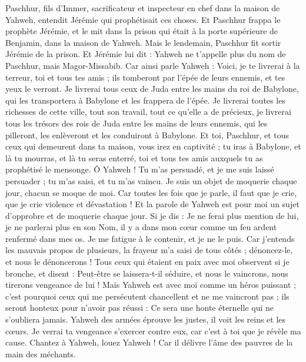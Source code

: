 \begin{multicols}{2}
\VerseOne{}Paschhur, fils d'Immer, sacrificateur et inspecteur en chef dans la maison de Yahweh, entendit Jérémie qui prophétisait ces choses.
Et Paschhur frappa le prophète Jérémie, et le mit dans la prison qui était à la porte supérieure de Benjamin, dans la maison de Yahweh.
Mais le lendemain, Paschhur fit sortir Jérémie de la prison. Et Jérémie lui dit : Yahweh ne t'appelle plus du nom de Paschhur, mais Magor-Missabib.
Car ainsi parle Yahweh : Voici, je te livrerai à la terreur, toi et tous tes amis ; ils tomberont par l'épée de leurs ennemis, et tes yeux le verront. Je livrerai tous ceux de Juda entre les mains du roi de Babylone, qui les transportera à Babylone et les frappera de l'épée.
Je livrerai toutes les richesses de cette ville, tout son travail, tout ce qu'elle a de précieux, je livrerai tous les trésors des rois de Juda entre les mains de leurs ennemis, qui les pilleront, les enlèveront et les conduiront à Babylone.
Et toi, Paschhur, et tous ceux qui demeurent dans ta maison, vous irez en captivité ; tu iras à Babylone, et là tu mourras, et là tu seras enterré, toi et tous tes amis auxquels tu as prophétisé le mensonge.
Ô Yahweh ! Tu m'as persuadé, et je me suis laissé persuader ; tu m'as saisi, et tu m'as vaincu. Je suis un objet de moquerie chaque jour, chacun se moque de moi.
Car toutes les fois que je parle, il faut que je crie, que je crie violence et dévastation ! Et la parole de Yahweh est pour moi un sujet d'opprobre et de moquerie chaque jour.
Si je dis : Je ne ferai plus mention de lui, je ne parlerai plus en son Nom, il y a dans mon cœur comme un feu ardent renfermé dans mes os. Je me fatigue à le contenir, et je ne le puis.
Car j'entends les mauvais propos de plusieurs, la frayeur m'a saisi de tous côtés ; dénoncez-le, et nous le dénoncerons ! Tous ceux qui étaient en paix avec moi observent si je bronche, et disent : Peut-être se laissera-t-il séduire, et nous le vaincrons, nous tirerons vengeance de lui !
Mais Yahweh est avec moi comme un héros puissant ; c'est pourquoi ceux qui me persécutent chancellent et ne me vaincront pas ; ils seront honteux pour n'avoir pas réussi : Ce sera une honte éternelle qui ne s'oubliera jamais.
Yahweh des armées éprouve les justes, il voit les reins et les cœurs. Je verrai ta vengeance s'exercer contre eux, car c'est à toi que je révèle ma cause.
Chantez à Yahweh, louez Yahweh ! Car il délivre l'âme des pauvres de la main des méchants.

\end{multicols}
